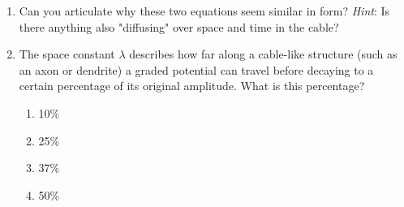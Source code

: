 \documentclass[11pt,letterpaper]{article}
\begin{document}
\begin{enumerate}
    \begin{enumerate}
        \item Can you articulate why these two equations seem similar in form? \emph{Hint}: Is there anything also "diffusing" over space and time in the cable?

        \vspace{3 cm}

        \item The space constant $\lambda$ describes how far along a cable-like structure (such as an axon or dendrite) a graded potential can travel before decaying to a certain percentage of its original amplitude. What is this percentage?
        \begin{enumerate}
            \item 10\%
            \item 25\%
            \item 37\%
            \item 50\%
        \end{enumerate}
    \end{enumerate}

\end{enumerate}


\pagebreak
\end{document}
